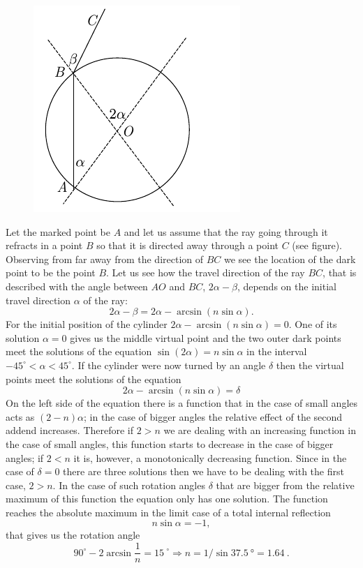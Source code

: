 {\ifEngSolution
\begin{figure}%
\includegraphics[trim = 0mm 0mm 12mm 0mm, clip, width=1\linewidth]{2014-v3g-10-silinder}
\end{figure}
Let the marked point be $A$ and let us assume that the ray going through it refracts in a point $B$ so that it is directed away through a point $C$ (see figure). Observing from far away from the direction of $BC$ we see the location of the dark point to be the point $B$. Let us see how the travel direction of the ray $BC$, that is described with the angle between $AO$ and $BC$, $2\alpha-\beta$, depends on the initial travel direction $\alpha$ of the ray:
$$2\alpha-\beta= 2\alpha-\arcsin (n\sin\alpha).$$
For the initial position of the cylinder $2\alpha-\arcsin (n\sin\alpha) =0$. One of its solution $\alpha=0$ gives us the middle virtual point and the two outer dark points meet the solutions of the equation $\sin(2\alpha)=n\sin\alpha$ in the interval $-45^\circ <\alpha<45^\circ$. If the cylinder were now turned by an angle $\delta$ then the virtual points meet the solutions of the equation
$$2\alpha-\arcsin (n\sin\alpha) =\delta$$
On the left side of the equation there is a function that in the case of small angles acts as $(2-n)\alpha$; in the case of bigger angles the relative effect of the second addend increases. Therefore if $2>n$ we are dealing with an increasing function in the case of small angles, this function starts to decrease in the case of bigger angles; if $2<n$ it is, however, a monotonically decreasing function. Since in the case of $\delta=0$ there are three solutions then we have to be dealing with the first case, $2>n$. In the case of such rotation angles $\delta$ that are bigger from the relative maximum of this function the equation only has one solution. The function reaches the absolute maximum in the limit case of a total internal reflection
$$n\sin\alpha=-1,$$
that gives us the rotation angle 
$$90^\circ-2\arcsin \frac 1n=\SI{15}{}^\circ\Rightarrow n=1/\sin \SI{37,5}{\degree} = \SI{1,64}{}.$$
\fi
}